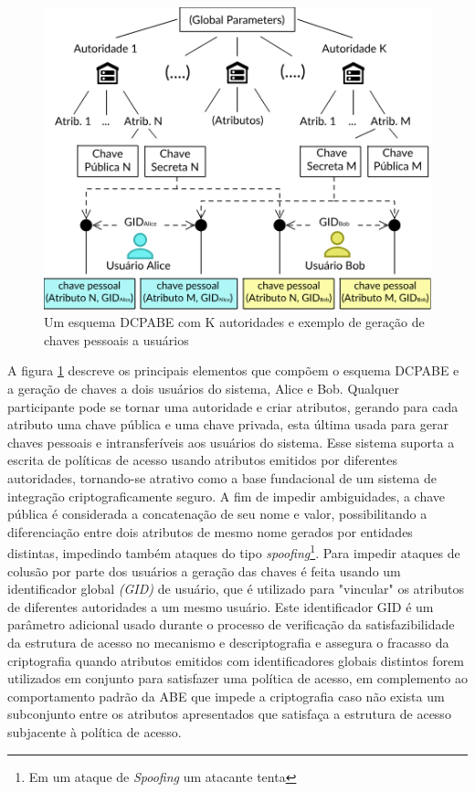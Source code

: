 \documentclass[a4paper,11pt]{article}
\begin{document}
\begin{figure}[!h]
  \centering
  \includegraphics[width=\textwidth]{images/diagrama-DCPABE.png}
  \caption{Um esquema DCPABE com K autoridades e exemplo de geração de chaves pessoais a usuários}
  \label{fig:diagramaDCPABE}
\end{figure}

A figura \ref{fig:diagramaDCPABE} descreve os principais elementos que compõem o esquema DCPABE e a geração de chaves a dois usuários do sistema, Alice e Bob.
Qualquer participante pode se tornar uma autoridade e criar atributos, gerando para cada atributo uma chave pública e uma chave privada, esta última usada para gerar chaves pessoais e intransferíveis aos usuários do sistema.
Esse sistema suporta a escrita de políticas de acesso usando atributos emitidos por diferentes autoridades, tornando-se atrativo como a base fundacional de um sistema de integração criptograficamente seguro.
A fim de impedir ambiguidades, a chave pública é considerada a concatenação de seu nome e valor, possibilitando a diferenciação entre dois atributos de mesmo nome gerados por entidades distintas, impedindo também ataques do tipo \emph{spoofing}\footnote{Em um ataque de \emph{Spoofing} um atacante tenta }.
Para impedir ataques de colusão por parte dos usuários a geração das chaves é feita usando um identificador global \emph{(GID)} de usuário, que é utilizado para "vincular" os atributos de diferentes autoridades a um mesmo usuário.
Este identificador GID é um parâmetro adicional usado durante o processo de verificação da satisfazibilidade da estrutura de acesso no mecanismo e descriptografia e assegura o fracasso da criptografia quando atributos emitidos com identificadores globais distintos forem utilizados em conjunto para satisfazer uma política de acesso, em complemento ao comportamento padrão da ABE que impede a criptografia caso não exista um subconjunto entre os atributos apresentados que satisfaça a estrutura de acesso subjacente à política de acesso.
\end{document}

